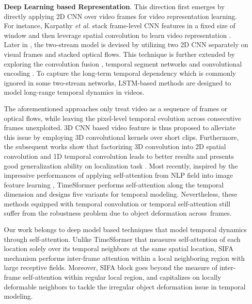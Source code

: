 \documentclass[10pt,twocolumn,letterpaper]{article}
\begin{document}
\textbf{Deep Learning based Representation}.
This direction first emerges by directly applying 2D CNN over video frames for video representation learning. For instance, Karpathy \emph{et al.} stack frame-level CNN features in a fixed size of window and then leverage spatial convolution to learn video representation \cite{Sports1M}.
Later in \cite{Simonyan:NIPS14}, the two-stream model is devised by utilizing two 2D CNN separately on visual frames and stacked optical flows.
This technique is further extended by exploring the convolution fusion \cite{Feichtenhofer:CVPR16}, temporal segment networks \cite{Wang:ECCV16,Feichtenhofer:CVPR17,Yao:AAAI21} and convolutional encoding \cite{Diba:CVPR17}.
To capture the long-term temporal dependency which is commonly ignored in some two-stream networks, LSTM-based methods \cite{Yue-Hei:CVPR15,Srivastava:ICML15} are designed to model long-range temporal dynamics in videos.

The aforementioned approaches only treat video as a sequence of frames or optical flows, while leaving the pixel-level temporal evolution across consecutive frames unexploited. 3D CNN based video feature \cite{Tran:ICCV15} is thus proposed to alleviate this issue by employing 3D convolutional kernels over short clips.
Furthermore, the subsequent works \cite{Carreira:CVPR17,Qiu:ICCV17,Qiu:CVPR19,Xie:ECCV18,Zhao:NIPS18} show that factorizing 3D convolution into 2D spatial convolution and 1D temporal convolution leads to better results and presents good generalization ability on localization task \cite{Long:CVPR19,Dong:MM19,Dong:CVPR21,Long:ECCV20, Long:TMM20}. Most recently, inspired by the impressive performances of applying self-attention from NLP field \cite{Vaswani:NIPS17} into image feature learning \cite{ViT,Swin-ViT,Li:PAMI},
TimeSformer \cite{Bertasius:ICML21} performs self-attention along the temporal dimension and designs five variants for temporal modeling. Nevertheless, these methods equipped with temporal convolution or temporal self-attention still suffer from the robustness problem due to object deformation across~frames.

Our work belongs to deep model based techniques that model temporal dynamics through self-attention. Unlike TimeSformer \cite{Bertasius:ICML21} that measures self-attention of each
location solely over its temporal neighbors at the same spatial location, SIFA mechanism performs inter-frame attention within a local neighboring region with large receptive fields. Moreover, SIFA block goes beyond the measure of inter-frame self-attention within regular local region, and capitalizes on locally deformable neighbors to tackle the irregular object deformation issue in temporal modeling.
\end{document}
